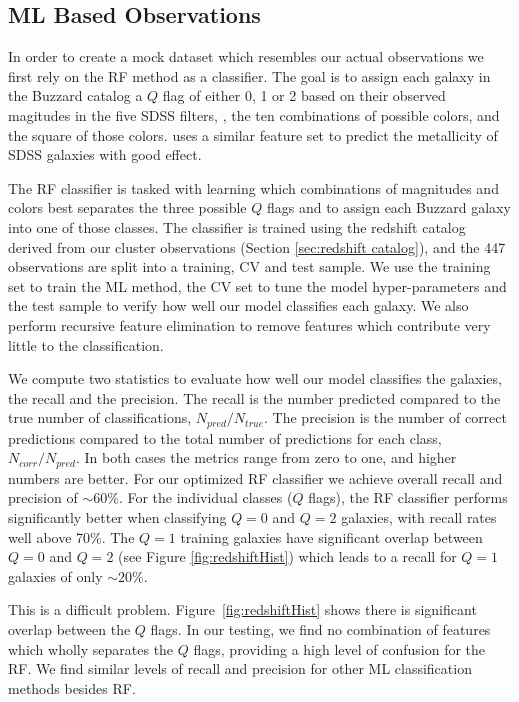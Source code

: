 \subsection{ML Based Observations}
In order to create a mock dataset which resembles our actual observations we first rely on the RF method as a classifier. The goal is to assign each galaxy in the Buzzard catalog a $Q$ flag of either 0, 1 or 2 based on their observed magitudes in the five SDSS filters, \sdssu\sdssg\sdssr\sdssi\sdssz, the ten combinations of possible colors, and the square of those colors. \cite{Acquaviva2016} uses a similar feature set to predict the metallicity of SDSS galaxies with good effect. 

The RF classifier is tasked with learning which combinations of magnitudes and colors best separates the three possible $Q$ flags and to assign each Buzzard galaxy into one of those classes. The classifier is trained using the redshift catalog derived from our cluster observations (Section \ref{sec:redshift catalog}), and the 447 observations are split into a training, CV and test sample. We use the training set to train the ML method, the CV set to tune the model hyper-parameters and the test sample to verify how well our model classifies each galaxy. We also perform recursive feature elimination to remove features which contribute very little to the classification.

We compute two statistics to evaluate how well our model classifies the galaxies, the recall and the precision. The recall is the number predicted compared to the true number of classifications, $N_{pred}/N_{true}$. The precision is the number of correct predictions compared to the total number of predictions for each class, $N_{corr}/N_{pred}$. In both cases the metrics range from zero to one, and higher numbers are better. For our optimized RF classifier we achieve overall recall and precision of $\sim60\%$. For the individual classes ($Q$ flags), the RF classifier performs significantly better when classifying $Q=0$ and $Q=2$ galaxies, with recall rates well above 70\%. The $Q=1$ training galaxies have significant overlap between $Q=0$ and $Q=2$ (see Figure \ref{fig:redshiftHist}) which leads to a recall for $Q=1$ galaxies of only $\sim20\%$. 

This is a difficult problem. Figure~\ref{fig:redshiftHist} shows there is significant overlap between the $Q$ flags. In our testing, we find no combination of features which wholly separates the $Q$ flags, providing a high level of confusion for the RF. We find similar levels of recall and precision for other ML classification methods besides RF.

